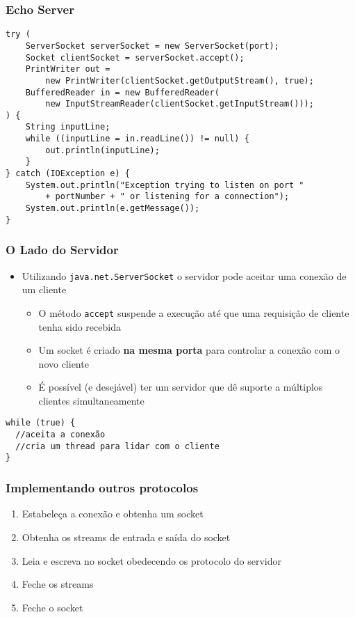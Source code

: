 \documentclass[Ligatures=TeX,table,brazil,svgnames,usetotalslideindicator,comp
ress,10pt]{beamer}
\begin{document}
\begin{frame}[fragile]
  \frametitle{Echo Server}
  \footnotesize
\begin{verbatim}
try (
    ServerSocket serverSocket = new ServerSocket(port);
    Socket clientSocket = serverSocket.accept();
    PrintWriter out =
        new PrintWriter(clientSocket.getOutputStream(), true);
    BufferedReader in = new BufferedReader(
        new InputStreamReader(clientSocket.getInputStream()));
) {
    String inputLine;
    while ((inputLine = in.readLine()) != null) {
        out.println(inputLine);
    }
} catch (IOException e) {
    System.out.println("Exception trying to listen on port "
        + portNumber + " or listening for a connection");
    System.out.println(e.getMessage());
}
\end{verbatim}
\end{frame}

\begin{frame}[fragile]
  \frametitle{O Lado do Servidor}
  \begin{itemize}
    \item Utilizando \texttt{java.net.ServerSocket} o servidor pode
      aceitar uma conexão de um cliente
    \begin{itemize}
      \item O método \texttt{accept} suspende a execução até que uma
        requisição de cliente tenha sido recebida
      \item Um socket é criado \textbf{na mesma porta} para controlar
        a conexão com o novo cliente
      \item É possível (e desejável) ter um servidor que dê suporte a
        múltiplos clientes simultaneamente
    \end{itemize}
  \end{itemize}
\footnotesize
\begin{verbatim}
while (true) {
  //aceita a conexão
  //cria um thread para lidar com o cliente
}
\end{verbatim}

\end{frame}

\begin{frame}
  \frametitle{Implementando outros protocolos}
  \begin{enumerate}
    \item Estabeleça a conexão e obtenha um socket
    \item Obtenha os streams de entrada e saída do socket
    \item Leia e escreva no socket obedecendo os protocolo do servidor
    \item Feche os streams
    \item Feche o socket
  \end{enumerate}
\end{frame}
\end{document}
